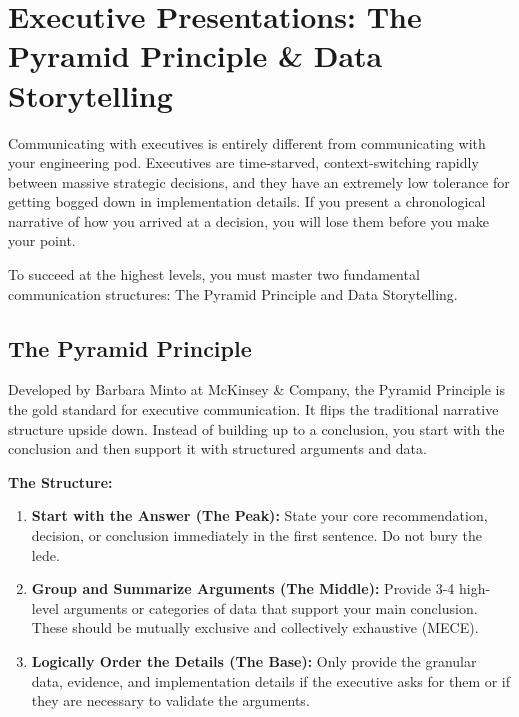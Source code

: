 \documentclass[
  11pt,
  openany,
  oneside]{book}
\providecommand{\tightlist}{%
  \setlength{\itemsep}{0pt}\setlength{\parskip}{0pt}}
\begin{document}
\bigskip

\section{Executive Presentations: The Pyramid Principle \& Data
Storytelling}\label{executive-presentations-the-pyramid-principle-data-storytelling}

Communicating with executives is entirely different from communicating
with your engineering pod. Executives are time-starved,
context-switching rapidly between massive strategic decisions, and they
have an extremely low tolerance for getting bogged down in
implementation details. If you present a chronological narrative of how
you arrived at a decision, you will lose them before you make your
point.

To succeed at the highest levels, you must master two fundamental
communication structures: The Pyramid Principle and Data Storytelling.

\subsection{The Pyramid Principle}\label{the-pyramid-principle}

Developed by Barbara Minto at McKinsey \& Company, the Pyramid Principle
is the gold standard for executive communication. It flips the
traditional narrative structure upside down. Instead of building up to a
conclusion, you start with the conclusion and then support it with
structured arguments and data.

\textbf{The Structure:}

\begin{enumerate}
\def\labelenumi{\arabic{enumi}.}
\tightlist
\item
  \textbf{Start with the Answer (The Peak):} State your core
  recommendation, decision, or conclusion immediately in the first
  sentence. Do not bury the lede.
\item
  \textbf{Group and Summarize Arguments (The Middle):} Provide 3-4
  high-level arguments or categories of data that support your main
  conclusion. These should be mutually exclusive and collectively
  exhaustive (MECE).
\item
  \textbf{Logically Order the Details (The Base):} Only provide the
  granular data, evidence, and implementation details if the executive
  asks for them or if they are necessary to validate the arguments.
\end{enumerate}
\end{document}
